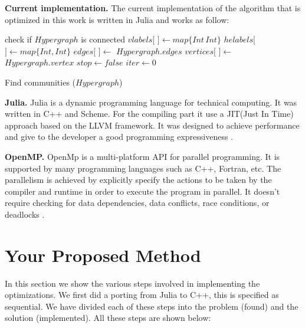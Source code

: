 \documentclass[conference]{IEEEtran}
\newcommand{\mypar}[1]{{\bf #1.}}
\begin{document}
\mypar{Current implementation}
The current implementation of the algorithm that is optimized in this work is written in Julia and works as follow:
\begin{algorithm}[h]
\label{alg:find_communities}
\SetAlgoLined
{}
    check if $Hypergraph$ is connected\;
    $vlabels[$ $] \gets map\{Int\,Int\}$\;
    $helabels[$ $] \gets map\{Int,Int\}$\;
    $edges[$ $] \gets$ $Hypergraph.edges$\;
    $vertices[$ $] \gets$ $Hypergraph.vertex$\;
    $stop \gets false$\;
    $iter \gets 0$\;
    \caption{Find communities ($Hypergraph$)}
\end{algorithm}

\mypar{Julia}
Julia is a dynamic programming language for technical computing. It was written in C++ and Scheme. For the compiling part it use a JIT(Just In Time) approach based on the LLVM framework. It was designed to achieve performance and give to the developer a good programming expressiveness \cite{Julia}.

\mypar{OpenMP}
OpenMp is a multi-platform API for parallel programming. It is supported by many programming languages such as C++, Fortran, etc. The parallelism is achieved by explicitly specify the actions to be taken by the compiler and runtime in order to execute the program in parallel. It doesn't require checking for data dependencies, data conflicts, race conditions, or deadlocks \cite{OpenMp}.

\section{Your Proposed Method}\label{sec:yourmethod}
In this section we show the various steps involved in implementing the optimizations. We first did a porting from Julia to C++, this is specified as sequential. We have divided each of these steps into the problem (found) and the solution (implemented). All these steps are shown below:
\end{document}
